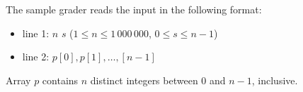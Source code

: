 The sample grader reads the input in the following format:
\begin{itemize}
\item line 1: $n$ $s$ ($1 \le n \le 1\,000\,000$, $0 \le s \le n-1$)
\item line 2: $p[0], p[1], \ldots, [n - 1]$
\end{itemize}

Array $p$ contains $n$ distinct integers between $0$ and $n-1$, inclusive.